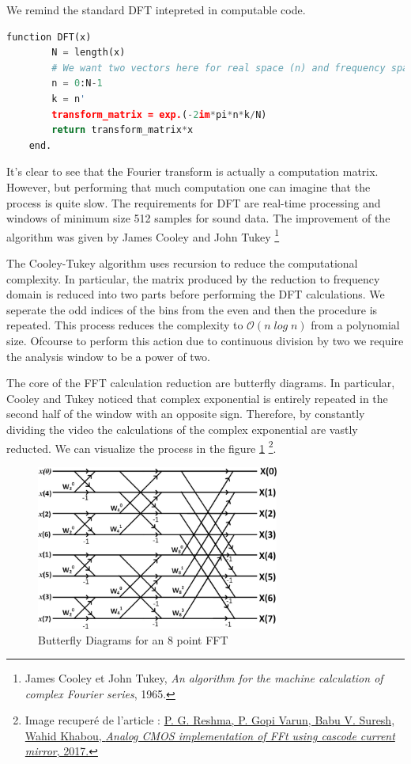 We remind the standard DFT intepreted in computable code.

    \begin{lstlisting}[language=Python, caption= DFT]
    function DFT(x)
        N = length(x)
        # We want two vectors here for real space (n) and frequency space (k)
        n = 0:N-1
        k = n'
        transform_matrix = exp.(-2im*pi*n*k/N)
        return transform_matrix*x
    end.
    \end{lstlisting}

It's clear to see that the Fourier transform is actually a computation matrix. However, but performing that much computation one can imagine that the process is quite slow. The requirements for DFT are real-time processing and windows of minimum size 512 samples for sound data. The improvement of the algorithm was given by James Cooley and John Tukey \footnote{James Cooley et John Tukey, \textit{An algorithm for the machine calculation of complex Fourier series}, 1965. \nocite{Fourier_complex}}
 
The Cooley-Tukey algorithm uses recursion to reduce the computational complexity. In particular, the matrix produced by the reduction to frequency domain is reduced into two parts before performing the DFT calculations. We seperate the odd indices of the bins from the even and then the procedure is repeated. This process reduces the complexity to $\mathcal{O}(n \; log \; n)$ from a polynomial size. Ofcourse to perform this action due to continuous division by two we require the analysis window to be a power of two. 

The core of the FFT calculation reduction are butterfly diagrams. In particular, Cooley and Tukey noticed that complex exponential is entirely repeated in the second half of the window with an opposite sign. Therefore, by constantly dividing the video the calculations of the complex exponential are vastly reducted. We can visualize the process in the figure \ref{Butterfly} \footnote{Image recuperé de l'article : \href{https://www.researchgate.net/figure/Radix-2-butterfly-diagram-for-8-point-FFT_fig1_312460770}{P. G. Reshma, P. Gopi Varun, Babu V. Suresh, Wahid Khabou, \textit{Analog CMOS implementation of FFt using cascode current mirror}, 2017.}}.

    \begin{figure}
        \centering
        \includegraphics[width = 8cm]{Graphs/Butterfly_8-point-FFT.png}
        \caption{Butterfly Diagrams for an 8 point FFT}
        \label{Butterfly}
    \end{figure}

